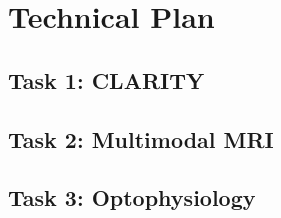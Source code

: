 \section{Technical Plan} \label{sec:tech}



% 

\subsection{Task 1: CLARITY} \label{sec:tech_math}
\subsection{Task 2: Multimodal MRI} \label{sec:tech_math}
\subsection{Task 3: Optophysiology} \label{sec:tech_math}


% 
% 
% 
% 






